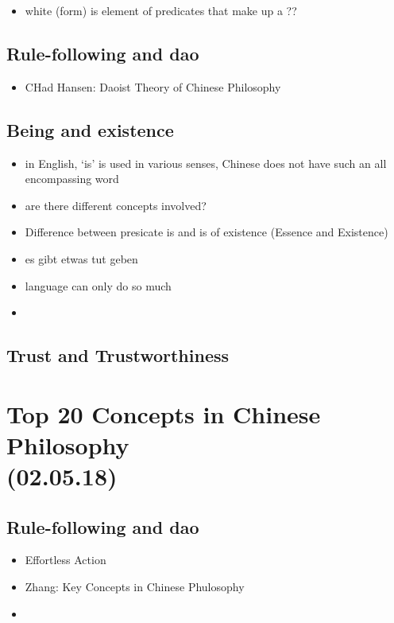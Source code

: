 \documentclass[emulatestandardclasses]{scrartcl}
\begin{document}
\begin{itemize}
  \item white (form) is element of predicates that make up a ??
\end{itemize}


\subsection{Rule-following and dao}

\begin{itemize}
  \item CHad Hansen: Daoist Theory of Chinese Philosophy
\end{itemize}


\subsection{Being and existence}

\begin{itemize}
  \item in English, `is' is used in various senses, Chinese does not have such an all encompassing word
  \item are there different concepts involved?
  \item Difference between presicate is and is of existence (Essence and Existence)
  \item es gibt etwas tut geben
  \item language can only do so much
  \item 
\end{itemize}


\subsection{Trust and Trustworthiness}


\section{Top 20 Concepts in Chinese Philosophy\\(02.05.18)}

\subsection{Rule-following and dao}

\begin{itemize}
  \item Effortless Action
  \item Zhang:  Key Concepts in Chinese Phulosophy
  \item 
\end{itemize}
\end{document}
